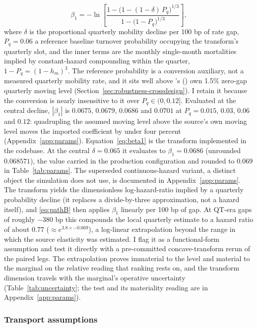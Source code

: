 \documentclass[12pt]{article}
\newcommand{\citepos}[1]{\citeauthor{#1}'s (\citeyear{#1})}
\begin{document}
\begin{equation}\label{eq:beta1}
\beta_1 = -\ln\!\left[\frac{1-\big(1-(1-\delta)\,P_q\big)^{1/3}}{1-\big(1-P_q\big)^{1/3}}\right],
\end{equation}
where $\delta$ is the proportional quarterly mobility decline per 100 bp of rate gap, $P_q = 0.06$ a reference baseline turnover probability occupying the transform's quarterly slot, and the inner terms are the monthly single-month mortalities implied by constant-hazard compounding within the quarter, $1 - P_q = (1 - h_m)^3$. The reference probability is a conversion auxiliary, not a measured quarterly mobility rate, and it sits well above \citepos{liebersohn2024} own 1.5\% zero-gap quarterly moving level (Section~\ref{sec:robustness-crossdesign}). I retain it because the conversion is nearly insensitive to it over $P_q \in (0, 0.12]$. Evaluated at the central decline, $|\beta_1|$ is $0.0675$, $0.0679$, $0.0686$ and $0.0701$ at $P_q = 0.015$, $0.03$, $0.06$ and $0.12$: quadrupling the assumed moving level above the source's own moving level moves the imported coefficient by under four percent (Appendix~\ref{app:params}). Equation~\eqref{eq:beta1} is the transform implemented in the codebase. At the central $\delta = 0.065$ it evaluates to $\beta_1 = 0.0686$ (unrounded $0.068571$), the value carried in the production configuration and rounded to $0.069$ in Table~\ref{tab:params}. The superseded continuous-hazard variant, a distinct object the simulation does not use, is documented in Appendix~\ref{app:params}. The transform yields the dimensionless log-hazard-ratio implied by a quarterly probability decline (it replaces a divide-by-three approximation, not a hazard itself), and \eqref{eq:pathB} then applies $\beta_1$ linearly per 100 bp of gap. At QT-era gaps of roughly $-380$ bp this compounds the local quarterly estimate to a hazard ratio of about $0.77$ ($\approx e^{3.8 \times -0.069}$), a log-linear extrapolation beyond the range in which the source elasticity was estimated. I flag it as a functional-form assumption and test it directly with a pre-committed concave-transform rerun of the paired legs. The extrapolation proves immaterial to the level and material to the marginal on the relative reading that ranking rests on, and the transform dimension travels with the marginal's operative uncertainty (Table~\ref{tab:uncertainty}; the test and its materiality reading are in Appendix~\ref{app:params}).

\subsubsection{Transport assumptions}
\end{document}
